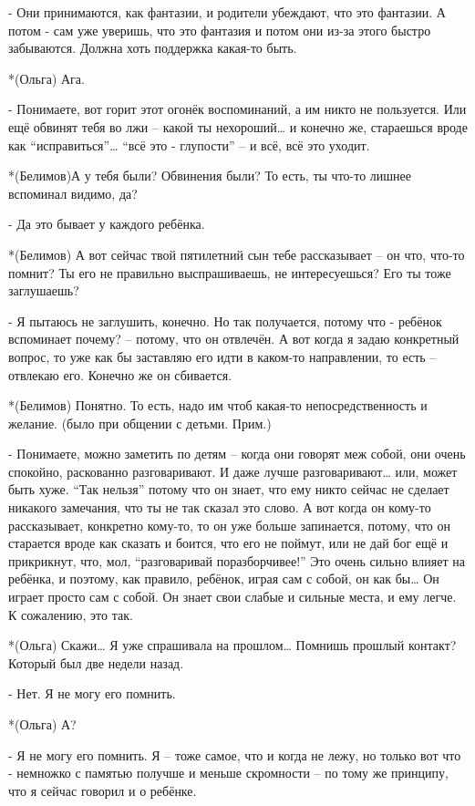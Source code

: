 - Они принимаются, как фантазии, и родители убеждают, что это фантазии. А потом - сам уже уверишь, что это фантазия и потом они из-за этого быстро забываются. Должна хоть поддержка какая-то быть.

*(Ольга) Ага.

- Понимаете, вот горит этот огонёк воспоминаний, а им никто не пользуется. Или ещё обвинят тебя во лжи – какой ты нехороший… и конечно же, стараешься вроде как “исправиться”… “всё это - глупости” – и всё, всё это уходит.

*(Белимов)А у тебя были? Обвинения были? То есть, ты что-то лишнее вспоминал видимо, да?

- Да это бывает у каждого ребёнка.

*(Белимов) А вот сейчас твой пятилетний сын тебе рассказывает – он что, что-то помнит? Ты его не правильно выспрашиваешь, не интересуешься?  Его ты тоже заглушаешь?

- Я пытаюсь не заглушить, конечно. Но так получается, потому что - ребёнок вспоминает почему? – потому, что он отвлечён. А вот когда я задаю конкретный вопрос, то уже как бы заставляю его идти в каком-то направлении, то есть – отвлекаю его. Конечно же он сбивается.

*(Белимов) Понятно. То есть, надо им чтоб какая-то непосредственность и желание. (было при общении с детьми. Прим.)

- Понимаете, можно заметить по детям – когда они говорят меж собой, они очень спокойно, раскованно разговаривают. И даже лучше разговаривают… или, может быть хуже. “Так нельзя” потому что он знает, что ему никто сейчас не сделает никакого замечания, что ты не так сказал это слово. А вот когда он кому-то рассказывает, конкретно кому-то, то он уже больше запинается, потому, что он старается вроде как сказать и боится, что его не поймут, или не дай бог ещё и прикрикнут, что, мол, “разговаривай поразборчивее!” Это очень сильно влияет на ребёнка, и поэтому, как правило, ребёнок, играя сам с собой, он как бы… Он играет просто сам с собой. Он знает свои слабые и  сильные места, и ему легче. К сожалению, это так.

*(Ольга) Скажи… Я уже спрашивала на прошлом… Помнишь прошлый контакт? Который был две недели назад.

- Нет. Я не могу его помнить.

*(Ольга) А?

- Я не могу его помнить. Я – тоже самое, что и когда не лежу, но только вот что - немножко с памятью получше и меньше скромности  – по тому же принципу, что я сейчас говорил и о ребёнке.

